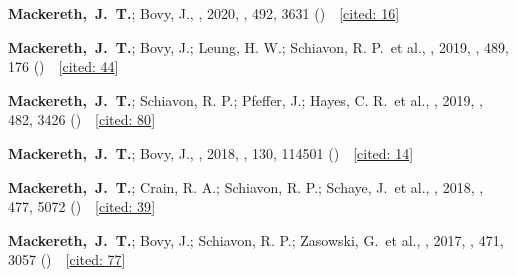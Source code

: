 \item[{\scriptsize6}]\textbf{Mackereth,~J.~T.}; Bovy, J., , 2020, \mnras, {492}, 3631 ()~~{\footnotesize[\href{http://adsabs.harvard.edu/abs/2020MNRAS.492.3631M}{cited: 16}]}

\item[{\scriptsize5}]\textbf{Mackereth,~J.~T.}; Bovy, J.; Leung, H. W.; Schiavon, R. P.~et al., , 2019, \mnras, {489}, 176 ()~~{\footnotesize[\href{http://adsabs.harvard.edu/abs/2019MNRAS.489..176M}{cited: 44}]}

\item[{\scriptsize4}]\textbf{Mackereth,~J.~T.}; Schiavon, R. P.; Pfeffer, J.; Hayes, C. R.~et al., , 2019, \mnras, {482}, 3426 ()~~{\footnotesize[\href{http://adsabs.harvard.edu/abs/2019MNRAS.482.3426M}{cited: 80}]}

\item[{\scriptsize3}]\textbf{Mackereth,~J.~T.}; Bovy, J., , 2018, \pasp, {130}, 114501 ()~~{\footnotesize[\href{http://adsabs.harvard.edu/abs/2018PASP..130k4501M}{cited: 14}]}

\item[{\scriptsize2}]\textbf{Mackereth,~J.~T.}; Crain, R. A.; Schiavon, R. P.; Schaye, J.~et al., , 2018, \mnras, {477}, 5072 ()~~{\footnotesize[\href{http://adsabs.harvard.edu/abs/2018MNRAS.477.5072M}{cited: 39}]}

\item[{\scriptsize1}]\textbf{Mackereth,~J.~T.}; Bovy, J.; Schiavon, R. P.; Zasowski, G.~et al., , 2017, \mnras, {471}, 3057 ()~~{\footnotesize[\href{http://adsabs.harvard.edu/abs/2017MNRAS.471.3057M}{cited: 77}]}